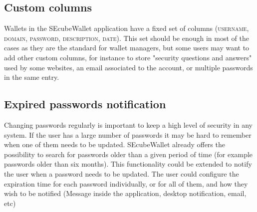 \subsection{Custom columns}

Wallets in the SEcubeWallet application have a fixed set of columns (\textsc{username}, \textsc{domain}, \textsc{password}, \textsc{description}, \textsc{date}). This set should be enough in most of the cases as they are the standard for wallet managers, but some users may want to add other custom columns, for instance to store "security questions and answers" used by some websites, an email associated to the account, or multiple passwords in the same entry.

\subsection{Expired passwords notification}

Changing passwords regularly is important to keep a high level of security in any system. If the user has a large number of passwords it may be hard to remember when one of them needs to be updated. SEcubeWallet already offers the possibility to search for passwords older than a given period of time (for example passwords older than six months). This functionality could be extended to notify the user when a password needs to be updated. The user could configure the expiration time for each password individually, or for all of them, and how they wish to be notified (Message inside the application, desktop notification, email, etc)






